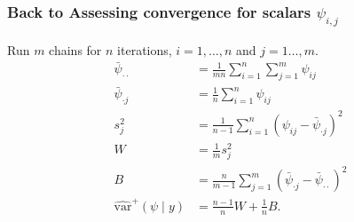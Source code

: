 \documentclass{beamer}
\begin{document}
\begin{frame}
\frametitle{Back to  Assessing convergence for scalars $\psi_{i,j}$}

Run $m$ chains for $n$ iterations, $i=1,\ldots,n$ and $j=1\ldots,m$.
\begin{align*}
\bar{\psi}_{\cdot \cdot} &= \frac{1}{mn}\sum_{i=1}^n\sum_{j=1}^m \psi_{ij} \tag{overall average} \\
\bar{\psi}_{\cdot j} &= \frac{1}{n}\sum_{i=1}^n \psi_{ij} \tag{chain average} \\
s^2_j &= \frac{1}{n-1}\sum_{i=1}^n (\psi_{ij}-\bar{\psi}_{\cdot j})^2 \tag{chain sd} \\
W &= \frac{1}{m} s^2_j \tag{within-sequence variance} \\
B &= \frac{n}{m-1} \sum_{j=1}^m (\bar{\psi}_{\cdot j} - \bar{\psi}_{\cdot \cdot})^2\\
\hat{\text{var}}^{+}(\psi \mid y) &=\frac{n-1}{n}W + \frac{1}{n}B.
\end{align*}



\end{frame}
\end{document}

